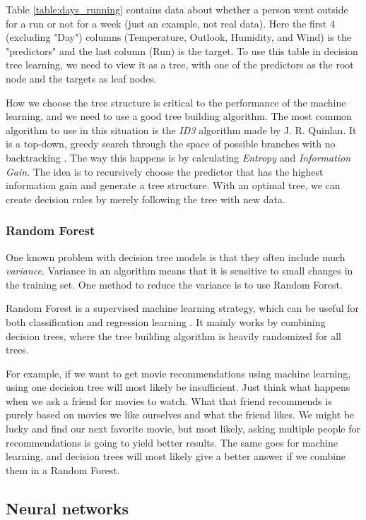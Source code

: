 Table \ref{table:days_running} contains data about whether a person went outside for a run or not for a week (just an example, not real data). 
Here the first 4 (excluding "Day") columns (Temperature, Outlook, Humidity, and Wind) is the "predictors" and the last column (Run) is the target. 
To use this table in decision tree learning, we need to view it as a tree, with one of the predictors as the root node and the targets as leaf nodes. 

How we choose the tree structure is critical to the performance of the machine learning, and we need to use a good tree building algorithm. 
The most common algorithm to use in this situation is the \textit{ID3} algorithm made by J. R. Quinlan. It is a top-down, greedy search through the space 
of possible branches with no backtracking \cite{decision_tree}. The way this happens is by calculating \textit{Entropy} and \textit{Information Gain}. 
The idea is to recursively choose the predictor that has the highest information gain and generate a tree structure. With an optimal tree, 
we can create decision rules by merely following the tree with new data.

\subsubsection{Random Forest}
One known problem with decision tree models is that they often include much \textit{variance}. Variance in an algorithm means that it is sensitive to small 
changes in the training set. One method to reduce the variance is to use Random Forest. 

Random Forest is a supervised machine learning strategy, which can be useful for both classification and regression learning \cite{random_forest}. 
It mainly works by combining decision trees, where the tree building algorithm is heavily randomized for all trees. 

For example, if we want to get movie recommendations using machine learning, using one decision tree will most likely be insufficient. 
Just think what happens when we ask a friend for movies to watch. What that friend recommends is purely based on movies we like ourselves and what the friend likes. 
We might be lucky and find our next favorite movie, but most likely, asking multiple people for recommendations is going to yield better results. 
The same goes for machine learning, and decision trees will most likely give a better answer if we combine them in a Random Forest.

\subsection{Neural networks}

